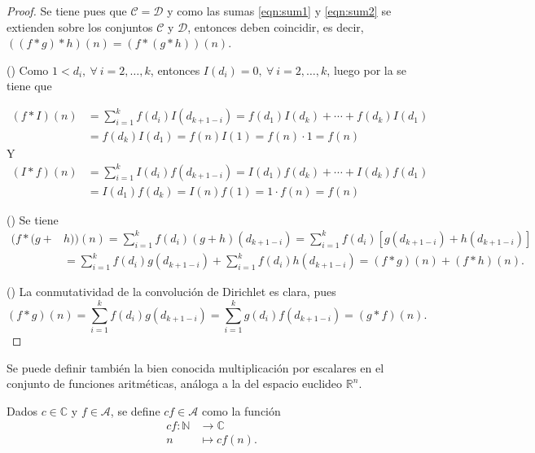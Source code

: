 \begin{proof}
Se tiene pues que $\mathcal{C}=\mathcal{D}$ y como las sumas \eqref{eqn:sum1} y \eqref{eqn:sum2} se extienden sobre los conjuntos $\mathcal{C}$ y $\mathcal{D}$, entonces deben coincidir, es decir, $((f*g)*h)(n)=(f*(g*h))(n)$.
\bigskip

({\scshape {}}) Como $1<d_i,\:\forall \: i=2,\ldots,k$, entonces $I(d_i)=0,\:\forall \: i=2,\ldots,k$, luego por la  se tiene que

\begin{align*}
	(f*I)(n) &= \sum_{i=1}^{k} f(d_i)I(d_{k+1-i})=f(d_1)I(d_k)+\cdots+f(d_k)I(d_1) \\
			 &= f(d_k)I(d_1)=f(n)I(1)=f(n)\cdot 1=f(n)
\end{align*}
Y
\begin{align*}
	(I*f)(n) &= \sum_{i=1}^{k} I(d_i)f(d_{k+1-i})=I(d_1)f(d_k)+\cdots+I(d_k)f(d_1) \\
			 &= I(d_1)f(d_k)=I(n)f(1)=1\cdot f(n)=f(n)
\end{align*}
\bigskip

({\scshape {}}) Se tiene
\begin{align*}
	(f*(g+ & h)) (n) = \sum_{i=1}^{k} f(d_i)(g+h)(d_{k+1-i}) = \sum_{i=1}^{k} f(d_i)[g(d_{k+1-i})+h(d_{k+1-i})] \\
		   & = \sum_{i=1}^{k} f(d_i)g(d_{k+1-i})+\sum_{i=1}^{k} f(d_i)h(d_{k+1-i}) = (f*g)(n)+(f*h)(n).
\end{align*}
\bigskip

({\scshape {}}) La conmutatividad de la convolución de Dirichlet es clara, pues 
\begin{equation*}
	(f*g)(n) = \sum_{i=1}^{k} f(d_i)g(d_{k+1-i}) = \sum_{i=1}^{k} g(d_i)f(d_{k+1-i})=(g*f)(n).
\end{equation*}
\end{proof}

Se puede definir también la bien conocida multiplicación por escalares en el conjunto de funciones aritméticas, análoga a la del espacio euclideo $\mathbb{R}^n$.

\begin{definition}
Dados $c \in \mathbb{C}$ y $f \in \mathcal{A}$, se define $c f \in \mathcal{A}$ como la función
\begin{align*}
    c f : \mathbb{N} & \longrightarrow \mathbb{C} \\
    n & \longmapsto c f(n).
\end{align*}
\end{definition}

